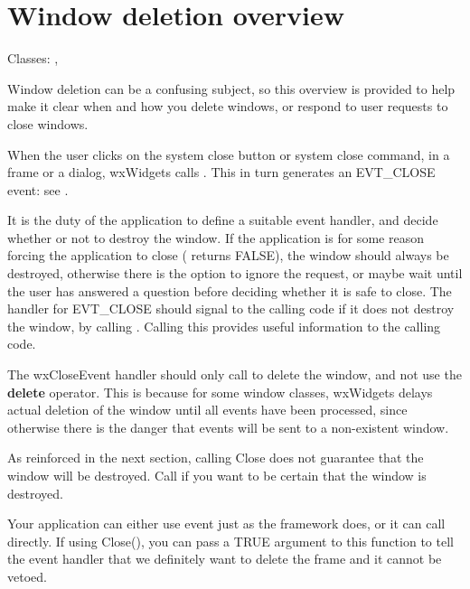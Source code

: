\section{Window deletion overview}\label{windowdeletionoverview}

Classes: , 

Window deletion can be a confusing subject, so this overview is provided
to help make it clear when and how you delete windows, or respond to user requests
to close windows.


When the user clicks on the system close button or system close command,
in a frame or a dialog, wxWidgets calls . This
in turn generates an EVT\_CLOSE event: see .

It is the duty of the application to define a suitable event handler, and
decide whether or not to destroy the window.
If the application is for some reason forcing the application to close
( returns FALSE), the window should always be destroyed, otherwise there is the option to
ignore the request, or maybe wait until the user has answered a question
before deciding whether it is safe to close. The handler for EVT\_CLOSE should
signal to the calling code if it does not destroy the window, by calling 
. Calling this provides useful information
to the calling code.

The wxCloseEvent handler should only call  to
delete the window, and not use the {\bf delete} operator. This is because
for some window classes, wxWidgets delays actual deletion of the window until all events have been processed,
since otherwise there is the danger that events will be sent to a non-existent window.

As reinforced in the next section, calling Close does not guarantee that the window
will be destroyed. Call  if you want to be
certain that the window is destroyed.


Your application can either use  event just as
the framework does, or it can call  directly.
If using Close(), you can pass a TRUE argument to this function to tell the event handler
that we definitely want to delete the frame and it cannot be vetoed.

